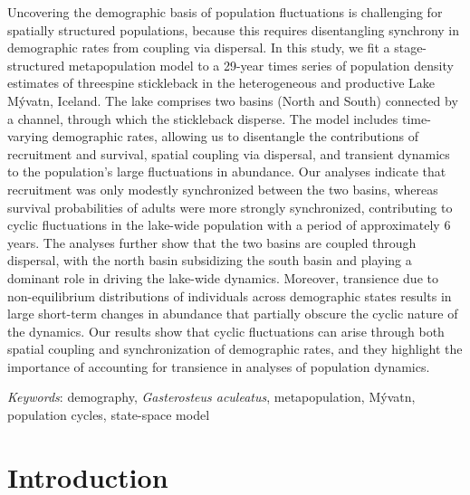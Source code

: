 \documentclass[11pt]{article}
\begin{document}
Uncovering the demographic basis of population fluctuations is challenging
for spatially structured populations,
because this requires disentangling synchrony in demographic rates
from coupling via dispersal.
In this study, we fit a stage-structured metapopulation model to a 29-year times series
of population density estimates of threespine stickleback in the heterogeneous
and productive Lake M\'{y}vatn, Iceland.
The lake comprises two basins (North and South) connected by a channel,
through which the stickleback disperse.
The model includes time-varying demographic rates,
allowing us to disentangle the contributions of recruitment and survival,
spatial coupling via dispersal, and transient dynamics
to the population’s large fluctuations in abundance.
Our analyses indicate that recruitment was only modestly synchronized between the two basins,
whereas survival probabilities of adults were more strongly synchronized,
contributing to cyclic fluctuations in the lake-wide population
with a period of approximately 6 years.
The analyses further show that the two basins are coupled through dispersal,
with the north basin subsidizing the south basin and playing a dominant role
in driving the lake-wide dynamics.
Moreover, transience due to non-equilibrium distributions of individuals
across demographic states results in large short-term changes in abundance
that partially obscure the cyclic nature of the dynamics.
Our results show that cyclic fluctuations can arise through both spatial coupling
and synchronization of demographic rates, and they highlight the importance
of accounting for transience in analyses of population dynamics.


\bigskip

\textit{Keywords}: {demography, \textit{Gasterosteus aculeatus}, metapopulation,
                    M\'{y}vatn, population cycles, state-space model}

\clearpage




\section*{Introduction} \label{introduction}
\end{document}

